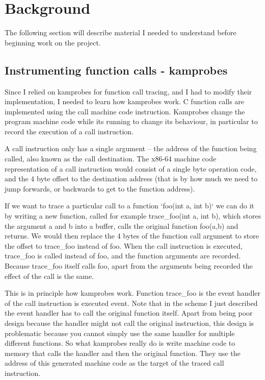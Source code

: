 \section{Background} 
    The following section will describe material I needed to understand before beginning work on the project.

    \subsection{Instrumenting function calls - kamprobes}
        Since I relied on kamprobes for function call tracing, and I had to modify their implementation, I needed to learn how kamprobes work. C function calls are implemented using the call machine code instruction. Kamprobes change the program machine code while its running to change its behaviour, in particular to record the execution of a call instruction.

        A call instruction only has a single argument -- the address of the function being called, also known as the call destination. The x86-64 machine code representation of a call instruction would consist of a single byte operation code, and the 4 byte offset to the destination address (that is by how much we need to jump forwards, or backwards to get to the function address).

        If we want to trace a particular call to a function `foo(int a, int b)` we can do it by writing a new function, called for example trace\_foo(int a, int b), which stores the argument a and b into a buffer, calls the original function foo(a,b) and returns. We would then replace the 4 bytes of the function call argument to store the offset to trace\_foo instead of foo. When the call instruction is executed, trace\_foo is called instead of foo, and the function arguments are recorded. Because trace\_foo itself calls foo, apart from the arguments being recorded the effect of the call is the same.

        This is in principle how kamprobes work. Function trace\_foo is the event handler of the call instruction is executed event. Note that in the scheme I just described the event handler has to call the original function itself. Apart from being poor design because the handler might not call the original instruction, this design is problematic because you cannot simply use the same handler for multiple different functions. So what kamprobes really do is write machine code to memory that calls the handler and then the original function. They use the address of this generated machine code as the target of the traced call instruction.

